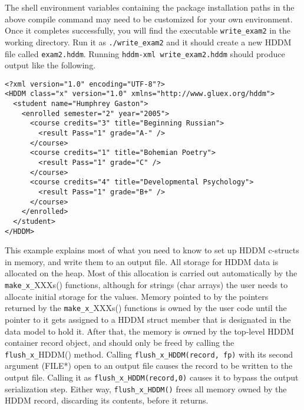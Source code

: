 \documentclass{revtex4}
\begin{document}
The shell environment variables containing the package installation paths in
the above compile command may need to be customized for your own environment.
Once it completes successfully, you will find the executable \texttt{write\_exam2}
in the working directory. Run it as \texttt{./write\_exam2} and it should create
a new HDDM file called \texttt{exam2.hddm}. Running
\texttt{hddm-{}xml write\_exam2.hddm} should produce output like the following.

\vspace{0.5cm}
\begin{minipage}{12cm}
\begin{verbatim}
<?xml version="1.0" encoding="UTF-8"?>
<HDDM class="x" version="1.0" xmlns="http://www.gluex.org/hddm">
  <student name="Humphrey Gaston">
    <enrolled semester="2" year="2005">
      <course credits="3" title="Beginning Russian">
        <result Pass="1" grade="A-" />
      </course>
      <course credits="1" title="Bohemian Poetry">
        <result Pass="1" grade="C" />
      </course>
      <course credits="4" title="Developmental Psychology">
        <result Pass="1" grade="B+" />
      </course>
    </enrolled>
  </student>
</HDDM>
\end{verbatim}
\end{minipage}
\vspace{0.5cm}

This example explains most of what you need to know to set up HDDM c-structs
in memory, and write them to an output file. All storage for HDDM data is
allocated on the heap. Most of this allocation is carried out automatically
by the \texttt{make\_x\_}XXXs() functions, although for strings (char arrays)
the user needs to allocate initial storage for the values. Memory pointed to
by the pointers returned by the \texttt{make\_x\_}XXXs() functions is owned
by the user code until the pointer to it gets assigned to a HDDM struct member
that is designated in the data model to hold it. After that, the memory is
owned by the top-{}level HDDM container record object, and should only be
freed by calling the \texttt{flush\_x\_}HDDM() method. Calling
\texttt{flush\_x\_HDDM(record, fp)} with its second argument (FILE*) open
to an output file causes the record to be written to the output file.
Calling it as \texttt{flush\_x\_HDDM(record,0)} causes it to bypass the
output serialization step. Either way, \texttt{flush\_x\_HDDM()} frees all
memory owned by the HDDM record, discarding its contents, before it returns.
\end{document}
